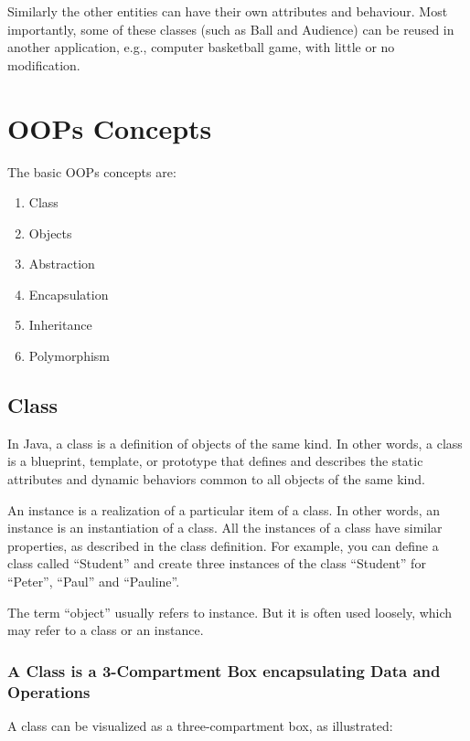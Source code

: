 \documentclass[11pt,a4paper]{article}
\begin{document}
Similarly the other entities can have their own attributes and behaviour. Most importantly, some of these classes (such as Ball and Audience) can be reused in another application, e.g., computer basketball game, with little or no modification.

\section*{OOPs Concepts}
The basic OOPs concepts are:
\begin{enumerate}
\item Class
\item Objects
\item Abstraction
\item Encapsulation
\item Inheritance
\item Polymorphism
\end{enumerate}
\subsection*{Class}
In Java, a class is a definition of objects of the same kind. In other words, a class is a blueprint, template, or prototype that defines and describes the static attributes and dynamic behaviors common to all objects of the same kind.

An instance is a realization of a particular item of a class. In other words, an instance is an instantiation of a class. All the instances of a class have similar properties, as described in the class definition. For example, you can define a class called ``Student'' and create three instances of the class ``Student'' for ``Peter'', ``Paul'' and ``Pauline''.

The term ``object'' usually refers to instance. But it is often used loosely, which may refer to a class or an instance.

\subsubsection*{A Class is a 3-Compartment Box encapsulating Data and Operations}
A class can be visualized as a three-compartment box, as illustrated:
\end{document}
